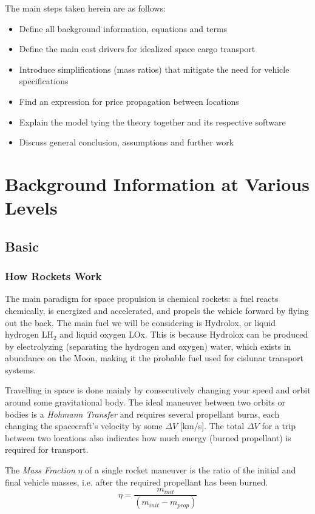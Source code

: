 \documentclass{article}
\begin{document}
The main steps taken herein are as follows:
\begin{itemize}
    \item Define all background information, equations and terms
    \item Define the main cost drivers for idealized space cargo transport
    \item Introduce simplifications (mass ratios) that mitigate the need for vehicle specifications
    \item Find an expression for price propagation between locations
    \item Explain the model tying the theory together and its respective software
    \item Discuss general conclusion, assumptions and further work
\end{itemize}

\section{Background Information at Various Levels}
\subsection{Basic}
\subsubsection{How Rockets Work}
The main paradigm for space propulsion is chemical rockets: a fuel reacts chemically, is energized and accelerated, and propels the vehicle forward by flying out the back. The main fuel we will be considering is Hydrolox, or liquid hydrogen LH$_{2}$ and liquid oxygen LOx. This is because Hydrolox can be produced by electrolyzing (separating the hydrogen and oxygen) water, which exists in abundance on the Moon, making it the probable fuel used for cislunar transport systems.

Travelling in space is done mainly by consecutively changing your speed and orbit around some gravitational body. The ideal maneuver between two orbits or bodies is a \textit{Hohmann Transfer} and requires several propellant burns, each changing the spacecraft's velocity by some $\Delta V$ [km/s]. The total $\Delta V$ for a trip between two locations also indicates how much energy (burned propellant) is required for transport.

The \textit{Mass Fraction} $\eta$ of a single rocket maneuver is the ratio of the initial and final vehicle masses, i.e. after the required propellant has been burned.
\begin{equation}
\eta = \frac{m_{init}}{(m_{init} - m_{prop})}
\end{equation}
\end{document}

